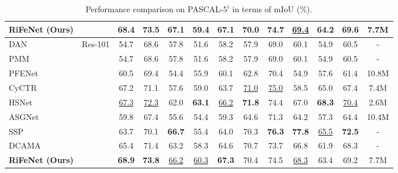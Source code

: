 \documentclass[letterpaper]{article} %
\begin{document}
\begin{table}[!t]
\begin{threeparttable}
{\begin{tabular}{l|c|ccccc|ccccc|c}
\textbf{RiFeNet (Ours)}&							&\textbf{68.4}&\textbf{73.5}&\textbf{67.1}&59.4&\textbf{67.1}	&70.0&\textbf{74.7}&\underline{69.4}&64.2&\textbf{69.6}	&7.7M\\
\midrule
DAN~\citeyear{wang2020few}       	&\multirow{9}{*}{Res-101}	&54.7&68.6&57.8&51.6&58.2	&57.9&69.0&60.1&54.9&60.5	&-\\
PMM~\citeyear{yang2020prototype} &&54.7&68.6&57.8&51.6&58.2 &57.9&69.0&60.1&54.9&60.5&-\\
PFENet~\citeyear{tian2020prior}   	& 						 	&60.5&69.4&54.4&55.9&60.1	&62.8&70.4&54.9&57.6&61.4	&10.8M\\
CyCTR~\citeyear{zhang2021few}  	&							&67.2&71.1&57.6&59.0&63.7 &\underline{71.0}&\underline{75.0}&58.5&65.0&67.4	&7.4M\\
HSNet~\citeyear{tao2020hierarchical}    	& 							&\underline{67.3}&\underline{72.3}&62.0&\textbf{63.1}&\underline{66.2}	&\textbf{71.8}&74.4&67.0&\textbf{68.3}&\underline{70.4}	&2.6M\\
ASGNet~\citeyear{li2021adaptive}		&							&59.8&67.4&55.6&54.4&59.3	&64.6&71.3&64.2&57.3&64.4&10.4M\\
SSP~\citeyear{fan2022self}		&							&63.7&70.1&\textbf{66.7}&55.4&64.0  &70.3&\textbf{76.3}&\textbf{77.8}&\underline{65.5}&\textbf{72.5}&-	\\
DCAMA~\citeyear{shi2022dense}		&							&65.4&71.4&63.2&58.3&64.6	&70.7&73.7&66.8&61.9&68.3&-	\\
\textbf{RiFeNet (Ours)}&							&\textbf{68.9}&\textbf{73.8}&\underline{66.2}&\underline{60.3}&\textbf{67.3}	&70.4&74.5&\underline{68.3}&63.4&69.2&7.7M\\
\bottomrule[1pt]
\end{tabular}}
\end{threeparttable}
\caption{Performance comparison on PASCAL-$5^i$ in terms of mIoU ($\%$).}
\label{sotapascal}
\end{table}
\end{document}
